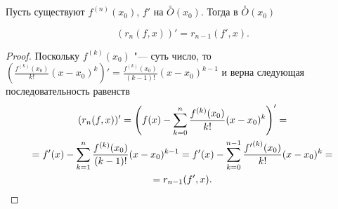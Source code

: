 \begin{lemm}\label{ch5:simplemm}
Пусть существуют $f^{(n)}(x_0)$, $f'$ на $\overset{\circ}{O}(x_0)$. Тогда в $\overset{\circ}{O}(x_0)$

$$
(r_n(f,x))'=r_{n-1}(f',x).
$$
\end{lemm}
\begin{proof}
Поскольку $f^{(k)}(x_0)$ "--- суть число, то $\left(\frac{f^{(k)}(x_0)}{k!} (x - x_0)^k\right)' =  \frac{f^{(k)}(x_0)}{(k-1)!} (x - x_0)^{k-1} $ и верна следующая последовательность равенств
\begin{multline*}
(r_n(f,x))' = \left(f(x) - \sum_{k = 0}^{n} \frac{f^{(k)}(x_0)}{k!} (x - x_0)^k \right)' =
\\ = f'(x) - \sum_{k = 1}^{n} \frac{f^{(k)}(x_0)}{(k-1)!} (x - x_0)^{k-1}= f'(x) - \sum_{k = 0}^{n-1} \frac{{f'} ^{(k)}(x_0)}{k!} (x - x_0)^k =\\=r_{n-1}(f',x). \qedhere
\end{multline*}
\end{proof}

